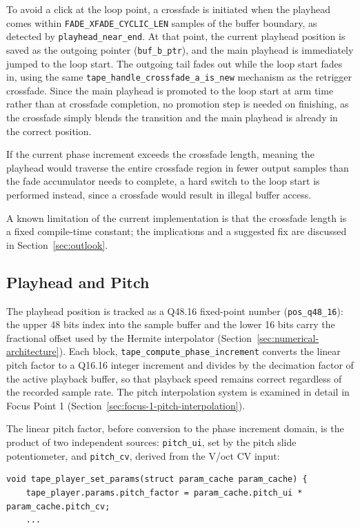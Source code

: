 To avoid a click at the loop point, a crossfade is initiated when the playhead comes within \texttt{FADE\_XFADE\_CYCLIC\_LEN} samples of the buffer boundary, as detected by \texttt{playhead\_near\_end}.
At that point, the current playhead position is saved as the outgoing pointer (\texttt{buf\_b\_ptr}), and the main playhead is immediately jumped to the loop start.
The outgoing tail fades out while the loop start fades in, using the same \texttt{tape\_handle\_crossfade\_a\_is\_new} mechanism as the retrigger crossfade.
Since the main playhead is promoted to the loop start at arm time rather than at crossfade completion, no promotion step is needed on finishing, as the crossfade simply blends the transition and the main playhead is already in the correct position.

If the current phase increment exceeds the crossfade length, meaning the playhead would traverse the entire crossfade region in fewer output samples than the fade accumulator needs to complete, a hard switch to the loop start is performed instead, since a crossfade would result in illegal buffer access.

A known limitation of the current implementation is that the crossfade length is a fixed compile-time constant; the implications and a suggested fix are discussed in Section~\ref{sec:outlook}.

\subsection{Playhead and Pitch}

The playhead position is tracked as a Q48.16 fixed-point number (\texttt{pos\_q48\_16}): the upper 48 bits index into the sample buffer and the lower 16 bits carry the fractional offset used by the Hermite interpolator (Section~\ref{sec:numerical-architecture}).
Each block, \texttt{tape\_compute\_phase\_increment} converts the linear pitch factor to a Q16.16 integer increment and divides by the decimation factor of the active playback buffer, so that playback speed remains correct regardless of the recorded sample rate.
The pitch interpolation system is examined in detail in Focus Point 1 (Section~\ref{sec:focus-1-pitch-interpolation}).

The linear pitch factor, before conversion to the phase increment domain, is the product of two independent sources: \texttt{pitch\_ui}, set by the pitch slide potentiometer, and \texttt{pitch\_cv}, derived from the V/oct CV input:

\begin{verbatim}
void tape_player_set_params(struct param_cache param_cache) {
	tape_player.params.pitch_factor = param_cache.pitch_ui * param_cache.pitch_cv;
	...
\end{verbatim}


